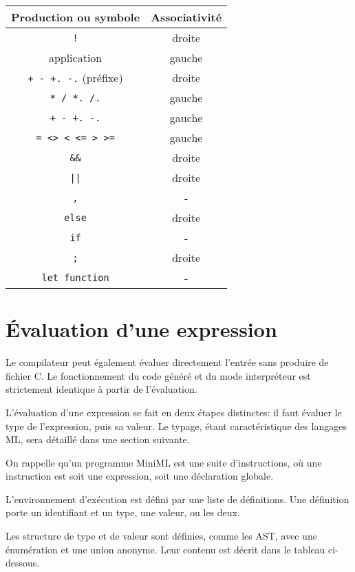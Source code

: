\documentclass[paper=a4, fontsize=11pt]{scrartcl}
\numberwithin{equation}{section}		%
\numberwithin{figure}{section}			%
\numberwithin{table}{section}				%
\begin{document}
\begin{center}
\begin{tabular}{ | c | c | }
\hline
    \textbf{Production ou symbole}  & \textbf{Associativité} \\ \hline
    \texttt{!} 						& droite \\ 
    application						& gauche \\ 
    \texttt{+ - +. -.} (préfixe)	& droite \\ 
    \texttt{* / *. /.} 				& gauche \\ 
    \texttt{+ - +. -.}				& gauche \\ 
    \texttt{= <> < <= > >=}		    & gauche \\ 
    \texttt{\&\&}					& droite \\ 
    \texttt{||}						& droite \\ 
    \texttt{,}						& - \\ 
    \texttt{else}					& droite \\ 
    \texttt{if}						& - \\ 
    \texttt{;}						& droite \\ 
    \texttt{let function}			& - \\
\hline
\end{tabular}
\end{center}


\newpage
\section{Évaluation d'une expression}

Le compilateur peut également évaluer directement l'entrée sans produire de fichier C.
Le fonctionnement du code généré et du mode interpréteur est strictement identique à partir de l'évaluation.

L'évaluation d'une expression se fait en deux étapes distinctes: il faut évaluer le type de l'expression, puis sa valeur.
Le typage, étant caractéristique des langages ML, sera détaillé dans une section suivante.

On rappelle qu'un programme MiniML est une suite d'instructions, où une instruction est soit une expression, soit une déclaration globale.

L'environnement d'exécution est défini par une liste de définitions.
Une définition porte un identifiant et un type, une valeur, ou les deux.

Les structure de type et de valeur sont définies, comme les AST, avec une énumération et une union anonyme.
Leur contenu est décrit dans le tableau ci-dessous.
\end{document}
